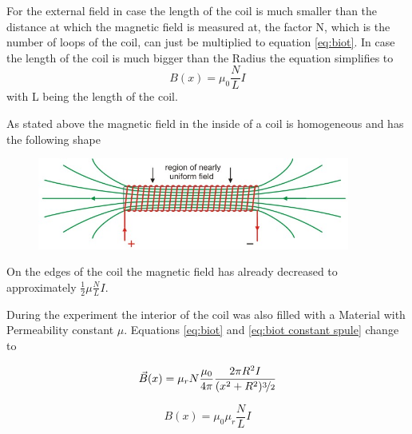 \documentclass[12pt]{article}
\begin{document}
			For the external field in case the length of the coil is much smaller than the distance at which the magnetic field is measured at, the factor N, which is the number of loops of the coil, can just be multiplied to equation \ref{eq:biot}. In case the length of the coil is much bigger than the Radius the equation simplifies to 
			\begin{equation} \label{eq:biot constant spule}
				B(x) = \mu_0 \frac{N}{L}I
			\end{equation}
		with L being the length of the coil.
		
		As stated above the magnetic field in the inside of a coil is homogeneous and has the following shape
		\begin{center}

		\begin{figure} [h] \label{fig: Magnetisches feld spule}
			\centering
			\includegraphics[height= 3cm]{fieldsol.jpg}
		\end{figure}
			\end{center}
	
	
		On the edges of the coil the magnetic field has already decreased to approximately $\frac{1}{2} \mu \frac{N}{L}I$.
		
		During the experiment the interior of the coil was also filled with a Material with Permeability constant $\mu$. Equations \ref{eq:biot} and \ref{eq:biot constant spule} change to
	
		\begin{equation}\label{eq:biot perm}
		\vec{B}(x) = \mu_r N \frac{\mu_0}{4\pi}\frac{2\pi R^2 I}{(x^2+R^2)\nicefrac{3}{2}}
		\end{equation}
	
		\begin{equation} \label{eq:biot constant spule mit perm}
		B(x) = \mu_0 \mu_r \frac{N}{L}I
		\end{equation}
	
\end{document}
